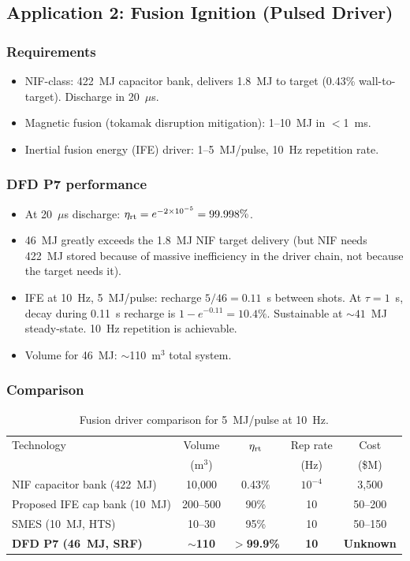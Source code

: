 \documentclass[11pt]{article}
\newcommand{\ee}[1]{\times 10^{#1}}
\begin{document}
\subsection{Application 2: Fusion Ignition (Pulsed Driver)}

\subsubsection{Requirements}
\begin{itemize}[nosep]
  \item NIF-class: 422~MJ capacitor bank, delivers 1.8~MJ to target
    (0.43\% wall-to-target). Discharge in 20~$\mu$s.
  \item Magnetic fusion (tokamak disruption mitigation): 1--10~MJ
    in $<$1~ms.
  \item Inertial fusion energy (IFE) driver: 1--5~MJ/pulse, 10~Hz
    repetition rate.
\end{itemize}

\subsubsection{DFD P7 performance}
\begin{itemize}[nosep]
  \item At 20~$\mu$s discharge: $\eta_{\rm rt} = e^{-2\ee{-5}} = 99.998\%$.
  \item 46~MJ greatly exceeds the 1.8~MJ NIF target delivery (but NIF
    needs 422~MJ stored because of massive inefficiency in the driver
    chain, not because the target needs it).
  \item IFE at 10~Hz, 5~MJ/pulse: recharge $5/46 = 0.11$~s between
    shots. At $\tau = 1$~s, decay during 0.11~s recharge is
    $1 - e^{-0.11} = 10.4\%$. Sustainable at $\sim 41$~MJ steady-state.
    10~Hz repetition is achievable.
  \item Volume for 46~MJ: $\sim$110~m$^3$ total system.
\end{itemize}

\subsubsection{Comparison}

\begin{table}[h]
\centering
\caption{Fusion driver comparison for 5~MJ/pulse at 10~Hz.}
\label{tab:fusion}
\begin{tabular}{@{}lcccc@{}}
\toprule
Technology & Volume & $\eta_{\rm rt}$ & Rep rate & Cost \\
 & (m$^3$) & & (Hz) & (\$M) \\
\midrule
NIF capacitor bank (422~MJ) & 10{,}000 & 0.43\% & $10^{-4}$ & 3{,}500 \\
Proposed IFE cap bank (10~MJ) & 200--500 & 90\% & 10 & 50--200 \\
SMES (10~MJ, HTS) & 10--30 & 95\% & 10 & 50--150 \\
\textbf{DFD P7 (46~MJ, SRF)} & \textbf{$\sim$110} & \textbf{$>$99.9\%}
  & \textbf{10} & \textbf{Unknown} \\
\bottomrule
\end{tabular}
\end{table}
\end{document}
